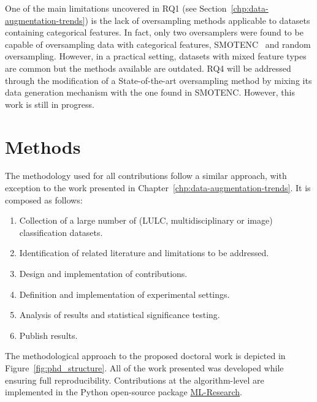 One of the main limitations uncovered in RQ1 (see
Section~\ref{chp:data-augmentation-trends}) is the lack of oversampling
methods applicable to datasets containing categorical features. In fact, only
two oversamplers were found to be capable of oversampling data with
categorical features, SMOTENC~\cite{Chawla2002} and random oversampling.
However, in a practical setting, datasets with mixed feature types are common
but the methods available are outdated. RQ4 will be addressed through the
modification of a State-of-the-art oversampling method by mixing its data
generation mechanism with the one found in SMOTENC\@. However, this work is
still in progress.

\section{Methods}

The methodology used for all contributions follow a similar approach, with
exception to the work presented in Chapter~\ref{chp:data-augmentation-trends}.
It is composed as follows:

\begin{enumerate}
    \item Collection of a large number of (LULC, multidisciplinary or image)
        classification datasets.
    \item Identification of related literature and limitations to be addressed.
    \item Design and implementation of contributions.
    \item Definition and implementation of experimental settings.
    \item Analysis of results and statistical significance testing.
    \item Publish results.
\end{enumerate}

The methodological approach to the proposed doctoral work is depicted in
Figure~\ref{fig:phd_structure}. All of the work presented was developed while
ensuring full reproducibility. Contributions at the algorithm-level are
implemented in the Python open-source package 
\href{https://github.com/joaopfonseca/ml-research}{ML-Research}.

